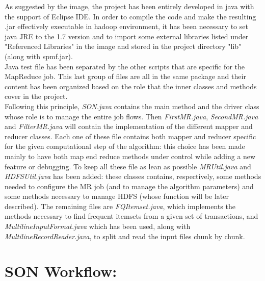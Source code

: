 \documentclass[]{report}
\begin{document}
	As suggested by the image, the project has been entirely developed in java with the support of Eclipse IDE. In order to compile the code and make the resulting .jar effectively executable in hadoop environment, it has been necessary to set java JRE to the 1.7 version and to import some external libraries listed under "Referenced Libraries" in the image and stored in the project directory "lib" (along with spmf.jar).\\
	Java test file has been separated by the other scripts that are specific for the MapReduce job. This last group of files are all in the same package and their content has been organized based on the role that the inner classes and methods cover in the project. \\
	Following this principle, \textit{SON.java} contains the main method and the driver class whose role is to manage the entire job flows. Then \textit{FirstMR.java}, \textit{SecondMR.java} and \textit{FilterMR.java} will contain the implementation of the different mapper and reducer classes. Each one of these file contains both mapper and reducer specific for the given computational step of the algorithm: this choice has been made mainly to have both map end reduce methods under control while adding a new feature or debugging. To keep all these file as lean as possible \textit{MRUtil.java} and \textit{HDFSUtil.java} has been added: these classes contains, respectively, some methods needed to configure the MR job (and to manage the algorithm parameters) and some methods necessary to manage HDFS (whose function will be later described). The remaining files are \textit{FQItemset.java}, which implements the methods necessary to find frequent itemsets from a given set of transactions, and \textit{MultilineInputFormat.java} which has been used, along with \textit{MultilineRecordReader.java}, to split and read the input files chunk by chunk.     	 
	
\section*{SON Workflow:}
\end{document}
